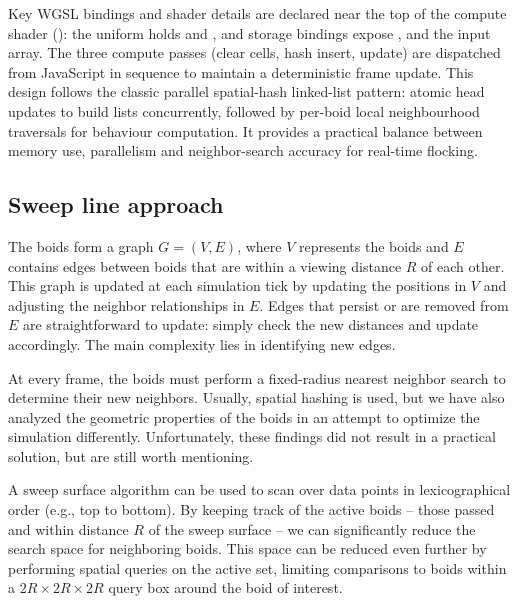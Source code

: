 \documentclass[a4paper, 12pt]{article}
\begin{document}
Key WGSL bindings and shader details are declared near the top of the compute
shader (): the uniform  holds
 and , and storage bindings expose
,  and the  input array. The three
compute passes (clear cells, hash insert, update) are dispatched from
JavaScript in sequence to maintain a deterministic frame update. \bigbreak This
design follows the classic parallel spatial-hash linked-list pattern: atomic
head updates to build lists concurrently, followed by per-boid local
neighbourhood traversals for behaviour computation. It provides a practical
balance between memory use, parallelism and neighbor-search accuracy for
real-time flocking.


\subsection{Sweep line approach}
\label{subsec:sweepline}
The boids form a graph $G=(V,E)$, where $V$ represents the boids and $E$ contains edges between boids
that are within a viewing distance $R$ of each other. This graph is updated at each simulation tick
by updating the positions in $V$ and adjusting the neighbor relationships in $E$. Edges that persist
or are removed from $E$ are straightforward to update: simply check the new distances and update
accordingly. The main complexity lies in identifying new edges.

At every frame, the boids must perform a fixed-radius nearest neighbor search to determine their new
neighbors. Usually, spatial hashing is used, but we have also analyzed the geometric properties
of the boids in an attempt to optimize the simulation differently. Unfortunately, these findings did
not result in a practical solution, but are still worth mentioning.

A sweep surface algorithm can be used to scan over data points in lexicographical order (e.g., top
to bottom). By keeping track of the active boids -- those passed and  within distance $R$ of the sweep
surface -- we can significantly reduce the search space for neighboring boids. This space can be
reduced even further by performing spatial queries on the active set, limiting comparisons to boids
within a $2R \times 2R \times 2R$ query box around the boid of interest.
\end{document}
